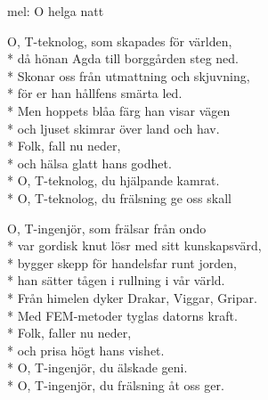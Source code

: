 \begin{SongText}[T-teknologen]
    \begin{SongInfo}
        mel: O helga natt
    \end{SongInfo}
    \begin{SongVerse}
        O, T-teknolog, som skapades för världen,\\*%
        då hönan Agda till borggården steg ned.\\*%
        Skonar oss från utmattning och skjuvning,\\*%
        för er han hållfens smärta led.\\*%
        Men hoppets blåa färg han visar vägen\\*%
        och ljuset skimrar över land och hav.\\*%
        Folk, fall nu neder,\\*%
        och hälsa glatt hans godhet.\\*%
        O, T-teknolog, du hjälpande kamrat.\\*%
        O, T-teknolog, du frälsning ge oss skall
    \end{SongVerse}
    \begin{SongVerse}
        O, T-ingenjör, som frälsar från ondo\\*%
        var gordisk knut lösr med sitt kunskapsvärd,\\*%
        bygger skepp för handelsfar runt jorden,\\*%
        han sätter tågen i rullning i vår värld.\\*%
        Från himelen dyker Drakar, Viggar, Gripar.\\*%
        Med FEM-metoder tyglas datorns kraft.\\*%
        Folk, faller nu neder,\\*%
        och prisa högt hans vishet.\\*%
        O, T-ingenjör, du älskade geni.\\*%
        O, T-ingenjör, du frälsning åt oss ger.
    \end{SongVerse}
\end{SongText}

